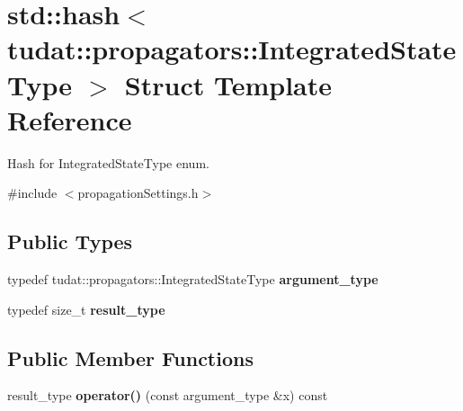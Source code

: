\hypertarget{structstd_1_1hash_3_01tudat_1_1propagators_1_1IntegratedStateType_01_4}{}\section{std\+:\+:hash$<$ tudat\+:\+:propagators\+:\+:Integrated\+State\+Type $>$ Struct Template Reference}
\label{structstd_1_1hash_3_01tudat_1_1propagators_1_1IntegratedStateType_01_4}


Hash for Integrated\+State\+Type enum.  




{\ttfamily \#include $<$propagation\+Settings.\+h$>$}

\subsection*{Public Types}
\begin{DoxyCompactItemize}
\item 
typedef tudat\+::propagators\+::\+Integrated\+State\+Type {\bfseries argument\+\_\+type}\hypertarget{structstd_1_1hash_3_01tudat_1_1propagators_1_1IntegratedStateType_01_4_af071914a95fb3b8931b26f90444ec5f2}{}\label{structstd_1_1hash_3_01tudat_1_1propagators_1_1IntegratedStateType_01_4_af071914a95fb3b8931b26f90444ec5f2}

\item 
typedef size\+\_\+t {\bfseries result\+\_\+type}\hypertarget{structstd_1_1hash_3_01tudat_1_1propagators_1_1IntegratedStateType_01_4_a3926db02391b57f4ef2915c26f574785}{}\label{structstd_1_1hash_3_01tudat_1_1propagators_1_1IntegratedStateType_01_4_a3926db02391b57f4ef2915c26f574785}

\end{DoxyCompactItemize}
\subsection*{Public Member Functions}
\begin{DoxyCompactItemize}
\item 
result\+\_\+type {\bfseries operator()} (const argument\+\_\+type \&x) const \hypertarget{structstd_1_1hash_3_01tudat_1_1propagators_1_1IntegratedStateType_01_4_ab45c712cd66d3302d08f0c4deb629c83}{}\label{structstd_1_1hash_3_01tudat_1_1propagators_1_1IntegratedStateType_01_4_ab45c712cd66d3302d08f0c4deb629c83}

\end{DoxyCompactItemize}


